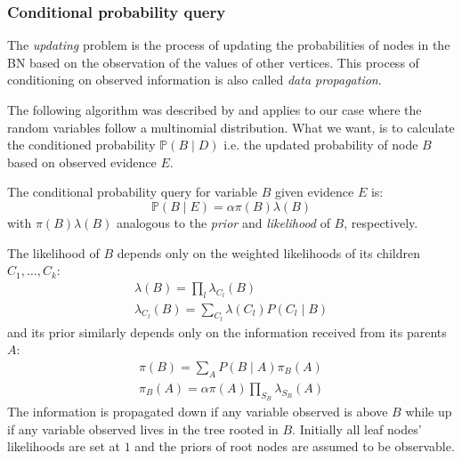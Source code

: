 \subsubsection{Conditional probability query}
The \textit{updating} problem is the process of updating the probabilities of nodes in the BN based on the observation of the values of other vertices.
This process of conditioning on observed information is also called \textit{data propagation}.

The following algorithm was described by \cite{Normand1992} and applies to our case where the random variables follow a multinomial distribution.
What we want, is to calculate the conditioned probability $\mathbb{P}(B \mid D)$ i.e. the updated probability of node $B$ based on observed evidence $E$.
\begin{definition}
	The conditional probability query for variable $B$ given evidence $E$ is:
\begin{equation} \label{eq:bnupdating}
	\mathbb{P}(B \mid E) = \alpha \pi(B) \lambda(B)
\end{equation}
with $\pi(B) \lambda(B)$ analogous to the \textit{prior} and \textit{likelihood} of $B$, respectively.
\end{definition}
The likelihood of $B$ depends only on the weighted likelihoods of its children $C_1, \ldots ,C_k$:\begin{align}
	\lambda(B) = \prod_l \lambda_{C_l}(B) \\
	\lambda_{C_{l}}(B)=\sum_{C_{l}} \lambda\left(C_{l}\right) P\left(C_{l} \mid B\right)
\end{align}
and its prior similarly depends only on the information received from its parents $A$:
\begin{align}
	\pi(B)=\sum_{A} P(B \mid A) \pi_{B}(A) \\
	\pi_{B}(A)=\alpha \pi(A) \prod_{S_{B}} \lambda_{S_{B}}(A)
\end{align}
The information is propagated down if any variable observed is above $B$ while up if any variable observed lives in the tree rooted in $B$.
Initially all leaf nodes' likelihoods are set at $1$ and the priors of root nodes are assumed to be observable.

